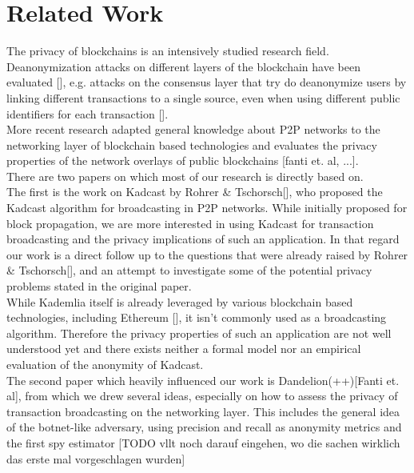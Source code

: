 \section{Related Work\label{related_work}}
The privacy of blockchains is an intensively studied research field.
Deanonymization attacks on different layers of the blockchain have been evaluated [],
e.g. attacks on the consensus layer that try do deanonymize users by linking
different transactions to a single source, even when using different public
identifiers for each transaction []. \\
More recent research adapted general knowledge about P2P networks to the networking layer
of blockchain based technologies and evaluates the privacy properties of the
network overlays of public blockchains [fanti et. al, ...]. \\
There are two papers on which most of our research is directly based on. \\
The first is the work on Kadcast by Rohrer \& Tschorsch[], who proposed the Kadcast
algorithm for broadcasting in P2P networks. While initially proposed for block propagation,
we are more interested in using Kadcast for transaction broadcasting and the privacy implications of such an application.
In that regard our work is a direct follow up to the questions that were
already raised by Rohrer \& Tschorsch[],
and an attempt to investigate some of the potential privacy problems
stated in the original paper. \\
While Kademlia itself is already leveraged by various blockchain based technologies, including Ethereum [],
it isn't commonly used as a broadcasting algorithm. Therefore the privacy properties of such an application
are not well understood yet and there exists neither a formal model nor an empirical evaluation of
the anonymity of Kadcast. \\
The second paper which heavily influenced our work is Dandelion(++)[Fanti et. al], from which we
drew several ideas, especially on how to assess the privacy of transaction broadcasting on the
networking layer. This includes the general idea of the botnet-like
adversary, using precision and recall as anonymity metrics and the first
spy estimator [TODO vllt noch darauf eingehen, wo die sachen wirklich
das erste mal vorgeschlagen wurden]

